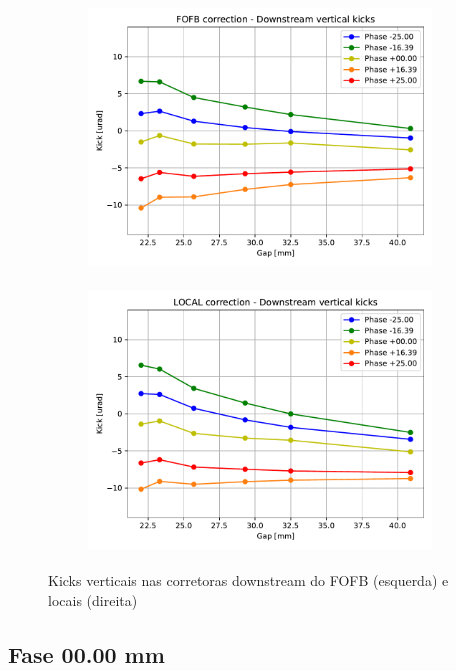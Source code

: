 \documentclass[a4paper,12pt]{article}
\begin{document}
\begin{figure}[H]
\begin{subfigure}{0.5\textwidth}
\includegraphics[width=0.9\linewidth, height=7cm]{figs/FOFB-down-kicky.pdf} 
\label{fig:subimfofbdowny}
\end{subfigure}
\begin{subfigure}{0.5\textwidth}
\includegraphics[width=0.9\linewidth, height=7cm]{figs/LOCAL-down-kicky.pdf}
\label{fig:subimlocaldowny}
\end{subfigure}
\caption{Kicks verticais nas corretoras downstream do FOFB (esquerda) e locais (direita)}
\label{fig:downy}
\end{figure}


\subsection{Fase 00.00 mm}
\end{document}
